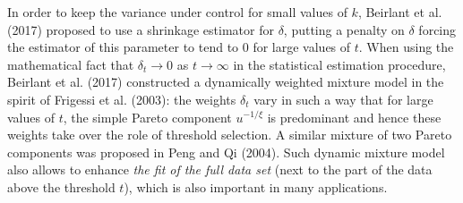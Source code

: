 \documentclass[a4paper,11pt]{article}
\begin{document}
In order to keep the variance under control for small values of $k$, Beirlant et al. (2017) proposed to use a shrinkage estimator for $\delta$, putting a penalty on $\delta$ forcing the estimator of this parameter to tend to 0 for large values of $t$. When using the mathematical fact that  $\delta_t \to 0$ as $t \to \infty$ in the statistical estimation procedure, Beirlant et al. (2017) constructed  a dynamically weighted mixture model in the spirit of Frigessi et al. (2003): the weights $\delta_t$  vary in such a way that for large values of $t$, the simple Pareto component $u^{-1/\xi}$ is predominant and hence these weights take over the role of threshold selection. A similar mixture of two Pareto components was proposed in Peng and Qi (2004). 
Such dynamic mixture  model also allows to enhance {\it the fit of the full data set} (next to the part of the data above the threshold $t$), which is also important in many applications.
\\
\end{document}
